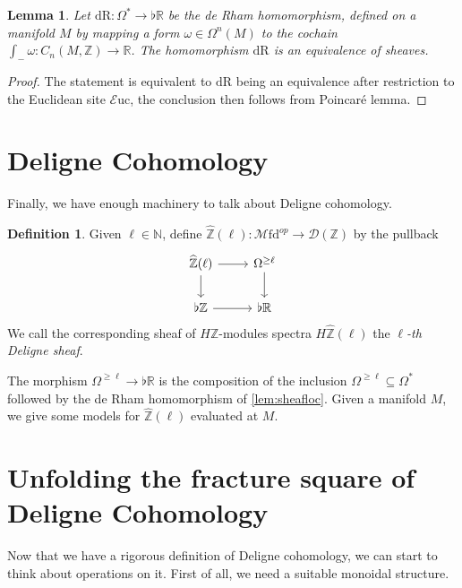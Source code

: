 \documentclass[10pt]{amsart}
\newcommand{\D}{\mathscr{D}}
\newcommand{\bE}{\mathbb{E}}
\newcommand{\bN}{\mathbb{N}}
\newcommand{\bR}{\mathbb{R}}
\newcommand{\bZ}{\mathbb{Z}}
\newcommand{\Euc}{\mathscr{E}\mathrm{uc}}
\newcommand{\Mfd}{\mathscr{M}\mathrm{fd}}
\newcommand{\dr}{\mathrm{dR}}
\newtheorem{lemma}[equation]{Lemma}
\theoremstyle{definition}
\newtheorem{definition}[equation]{Definition}
\theoremstyle{remark}
\numberwithin{equation}{section}
\begin{document}
\begin{lemma}\label{lem:derham}Let $\dr:\Omega^*\to\flat\bR$ be the \emph{de Rham homomorphism}, defined on a manifold $M$ by mapping a form $\omega\in\Omega^n(M)$ to the cochain $\int_-\omega:C_{n}(M,\bZ)\to\bR$. The homomorphism $\dr$ is an equivalence of sheaves.
\end{lemma}
\begin{proof}
  The statement is equivalent to $\dr$ being an equivalence after restriction to the Euclidean site $\Euc$, the conclusion then follows from Poincar\'e lemma. 
\end{proof}


\section{Deligne Cohomology}

Finally, we have enough machinery to talk about Deligne cohomology. 
\begin{definition}
  Given $\ell\in\bN$, define $\widehat{\bZ}(\ell):\Mfd^{op}\to\D(\bZ)$ by the pullback 
  \[\begin{tikzcd}
    \widehat{\bZ}(\ell)\arrow[r]\arrow[d] & \Omega^{\geq \ell}\arrow[d] \\
    \flat\bZ \arrow[r] & \flat\bR
  \end{tikzcd}\]We call the corresponding sheaf of $H\bZ$-modules spectra $H\widehat{\bZ}(\ell)$ the $\ell$\emph{-th Deligne sheaf}.
\end{definition}The morphism $\Omega^{\geq \ell}\to\flat\bR$ is the composition of the inclusion $\Omega^{\geq \ell}\subseteq\Omega^*$ followed by the de Rham homomorphism of \cref{lem:sheafloc}. Given a manifold $M$, we give some models for $\widehat{\bZ}(\ell)$ evaluated at $M$.


\section{Unfolding the fracture square of Deligne Cohomology}


Now that we have a rigorous definition of Deligne cohomology, we can start to think about operations on it. First of all, we need a suitable monoidal structure. 
\end{document}
